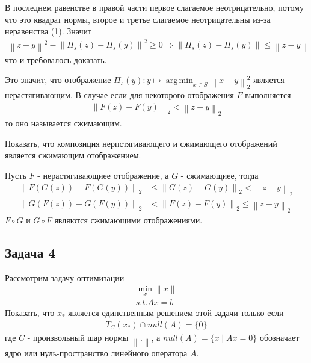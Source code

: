 \documentclass{article}
\DeclareMathOperator*{\argmin}{arg\,min}
\newcommand{\norm}[1]{\left\lVert#1\right\rVert}
\begin{document}
    В последнем равенстве в правой части первое слагаемое неотрицательно, потому что это квадрат нормы, второе и третье слагаемое неотрицательны из-за неравенства (1). Значит
    \begin{align*}
        \norm{z - y}^2 - \norm{\Pi_s(z) - \Pi_s(y)}^2 \ge 0 \Rightarrow  
        \norm{\Pi_s(z) - \Pi_s(y)} \le \norm{z - y}
    \end{align*}
    что и требовалось доказать.
    \bigbreak
    
    Это значит, что отображение $\Pi_s(y) : y \mapsto \argmin_{x \in S} \norm{x - y}_2^2$ является нерастягивающим. В случае если для некоторого отображения $F$ выполняется 
    \begin{align*}
        \norm{F(z) - F(y)}_2 < \norm{z - y}_2
    \end{align*}
    то оно называется сжимающим. 
    
    Показать, что композиция нерпстягивающего и сжимающего отображений является сжимающим отображением.
    
    Пусть $F$ - нерастягивающиее отображение, а $G$ - сжимающиее, тогда
    \begin{align*}
        \norm{F(G(z)) - F(G(y))}_2 &\le \norm{G(z) - G(y)}_2 < \norm{z - y}_2\\
        \norm{G(F(z)) - G(F(y))}_2 &< \norm{F(z) - F(y)}_2 \le \norm{z - y}_2
    \end{align*}
    $F \circ G$ и $G \circ F$ являются сжимающими отображениями.
    \bigbreak
    
    \subsection*{Задача 4}
    Рассмотрим задачу оптимизации
    \begin{align*}
        \min_x \norm{x}\\
        s.t. Ax = b
    \end{align*}
    Показать, что $x_*$ является единственным решением этой задачи только если
    \begin{align*}
        T_C(x_*) \cap null(A) = \{0\}
    \end{align*}
    где $C$ - произвольный шар нормы $\norm{.}$, а $null(A) = \{x \mid Ax = 0\}$ обозначает ядро или нуль-пространство линейного оператора $A$.
    \bigbreak
    
\end{document}
